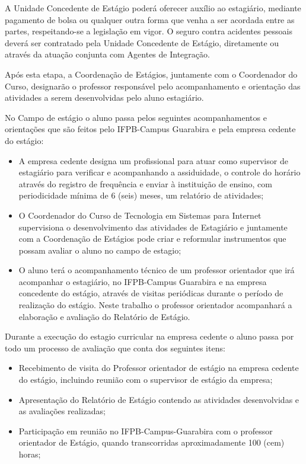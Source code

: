 	A Unidade Concedente de Estágio poderá oferecer auxílio ao estagiário, mediante pagamento de bolsa ou qualquer outra forma que venha a ser acordada entre as partes, respeitando-se a legislação em vigor. O seguro contra acidentes pessoais deverá ser contratado pela Unidade Concedente de Estágio, diretamente ou através da atuação conjunta com Agentes de Integração.
       
	   Após esta etapa, a Coordenação de Estágios, juntamente com o Coordenador do Curso, designarão o professor responsável pelo acompanhamento e orientação das atividades a serem desenvolvidas pelo aluno estagiário. 
	   
       No Campo de estágio o aluno passa pelos seguintes acompanhamentos e orientações que são feitos pelo IFPB-Campus Guarabira e pela empresa cedente do estágio:
	   
\begin{itemize}

	\item A empresa cedente designa um profissional para atuar como supervisor de estagiário para verificar e acompanhando a assiduidade, o controle do horário através do registro de frequência e enviar à instituição de ensino, com periodicidade mínima de 6 (seis) meses, um relatório de atividades;
	
	\item O Coordenador do Curso de Tecnologia em Sistemas para Internet supervisiona o desenvolvimento das atividades de Estagiário e juntamente com a Coordenação de Estágios pode criar e reformular instrumentos que possam avaliar o aluno no campo de estagio; 
	
	\item O aluno terá o acompanhamento técnico de um professor orientador que irá acompanhar o estagiário, no IFPB-Campus Guarabira e na empresa concedente do estágio, através de visitas periódicas durante o período de realização do estágio. Neste trabalho o professor orientador acompanhará a elaboração e avaliação do Relatório de Estágio.

\end{itemize}

	 Durante a execução do estagio curricular na empresa cedente o aluno passa por todo um processo de avaliação que conta dos seguintes itens:

\begin{itemize}
	\item Recebimento de visita do Professor orientador de estágio na empresa cedente do estágio, incluindo reunião com o supervisor de estágio da empresa;
	\item Apresentação do Relatório de Estágio contendo as atividades desenvolvidas e as avaliações realizadas;
	\item Participação em reunião no IFPB-Campus-Guarabira com o professor orientador de Estágio, quando transcorridas aproximadamente 100 (cem) horas;
\end{itemize}

